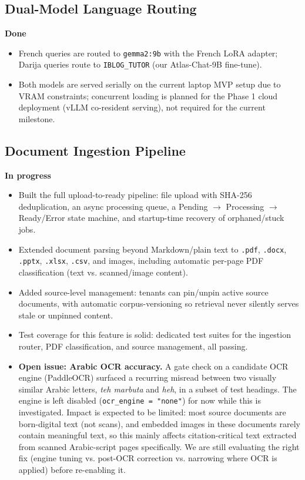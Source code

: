\documentclass[11pt]{article}
\newcommand{\statusdone}{\textcolor{accent}{\textbf{Done}}}
\newcommand{\statusprog}{\textcolor{muted}{\textbf{In progress}}}
\begin{document}
\subsection{Dual-Model Language Routing}
\statusdone
\begin{itemize}
    \item French queries are routed to \texttt{gemma2:9b} with the French LoRA adapter; Darija queries route to \texttt{IBLOG\_TUTOR} (our Atlas-Chat-9B fine-tune).
    \item Both models are served serially on the current laptop MVP setup due to VRAM constraints; concurrent loading is planned for the Phase 1 cloud deployment (vLLM co-resident serving), not required for the current milestone.
\end{itemize}

\subsection{Document Ingestion Pipeline}
\statusprog
\begin{itemize}
    \item Built the full upload-to-ready pipeline: file upload with SHA-256 deduplication, an async processing queue, a Pending $\rightarrow$ Processing $\rightarrow$ Ready/Error state machine, and startup-time recovery of orphaned/stuck jobs.
    \item Extended document parsing beyond Markdown/plain text to \texttt{.pdf}, \texttt{.docx}, \texttt{.pptx}, \texttt{.xlsx}, \texttt{.csv}, and images, including automatic per-page PDF classification (text vs. scanned/image content).
    \item Added source-level management: tenants can pin/unpin active source documents, with automatic corpus-versioning so retrieval never silently serves stale or unpinned content.
    \item Test coverage for this feature is solid: dedicated test suites for the ingestion router, PDF classification, and source management, all passing.
    \item \textbf{Open issue: Arabic OCR accuracy.} A gate check on a candidate OCR engine (PaddleOCR) surfaced a recurring misread between two visually similar Arabic letters, \emph{teh marbuta} and \emph{heh}, in a subset of test headings. The engine is left disabled (\texttt{ocr\_engine = "none"}) for now while this is investigated. Impact is expected to be limited: most source documents are born-digital text (not scans), and embedded images in these documents rarely contain meaningful text, so this mainly affects citation-critical text extracted from scanned Arabic-script pages specifically. We are still evaluating the right fix (engine tuning vs. post-OCR correction vs. narrowing where OCR is applied) before re-enabling it.
\end{itemize}
\end{document}
